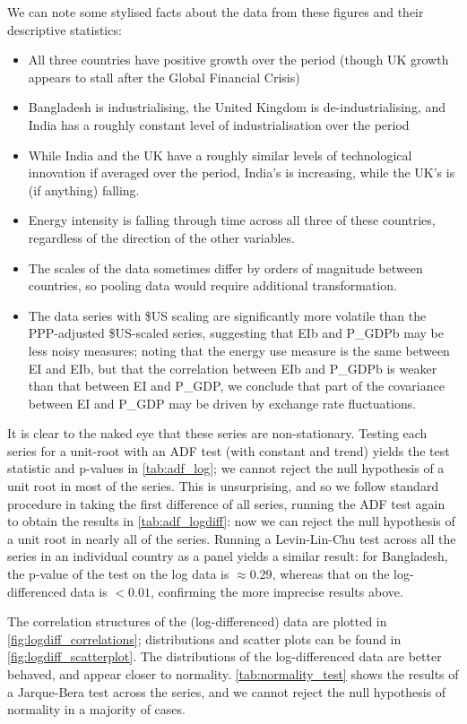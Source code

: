 \documentclass[11pt,a4paper]{article}
\begin{document}
We can note some stylised facts about the data from these figures and their descriptive statistics:
\begin{itemize}

\item All three countries have positive growth over the period (though UK growth appears to stall  after the Global Financial Crisis)
\item Bangladesh is industrialising, the United Kingdom is de-industrialising, and India has a roughly constant level of industrialisation over the period
\item While India and the UK have a roughly similar levels of technological innovation if averaged over the period, India's is increasing, while the UK's is (if anything) falling.
\item Energy intensity is falling through time across all three of these countries, regardless of the direction of the other variables.
\item The scales of the data sometimes differ by orders of magnitude between countries, so pooling data would require additional transformation.
\item The data series with \$US scaling are significantly more volatile than the PPP-adjusted \$US-scaled series, suggesting that EIb and P\_GDPb may be less noisy measures; noting that the energy use measure is the same between EI and EIb, but that the correlation between EIb and P\_GDPb is weaker than that between EI and P\_GDP, we conclude that part of the covariance between EI and P\_GDP may be driven by exchange rate fluctuations.
\end{itemize}
It is clear to the naked eye that these series are non-stationary.
Testing each series for a unit-root with an ADF test (with constant and trend) yields the test statistic and p-values in \cref{tab:adf_log}; we cannot reject the null hypothesis of a unit root in most of the series.
This is unsurprising, and so we follow standard procedure in taking the first difference of all series, running the ADF test again to obtain the results in \cref{tab:adf_logdiff}: now we can reject the null hypothesis of a unit root in nearly all of the series.
Running a Levin-Lin-Chu test across all the series in an individual country as a panel yields a similar result: for Bangladesh, the p-value of the test on the log data is $\approx0.29$, whereas that on the log-differenced data is $<0.01$, confirming the more imprecise results above.

The correlation structures of the (log-differenced) data are plotted in \cref{fig:logdiff_correlations}; distributions and scatter plots can be found in \cref{fig:logdiff_scatterplot}.
The distributions of the log-differenced data are better behaved, and appear closer to normality.
\cref{tab:normality_test} shows the results of a Jarque-Bera test across the series, and we cannot reject the null hypothesis of normality in a majority of cases.
\end{document}
